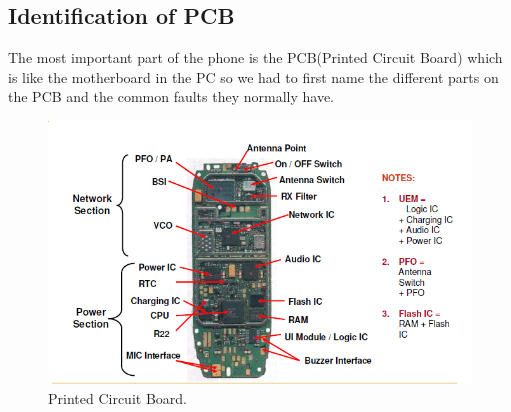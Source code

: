 \subsection{Identification of PCB}
The most important part of the phone is the PCB(Printed Circuit Board) which is like the motherboard in the PC so we had to first name the different parts on the PCB and the common faults they normally have.\\
\begin{figure}[h!]
\begin{center}
	\includegraphics[scale=0.9]{img/PCB.PNG}
	\caption{Printed Circuit Board.}
	\label{fig:symbols}
\end{center}
\end{figure}
